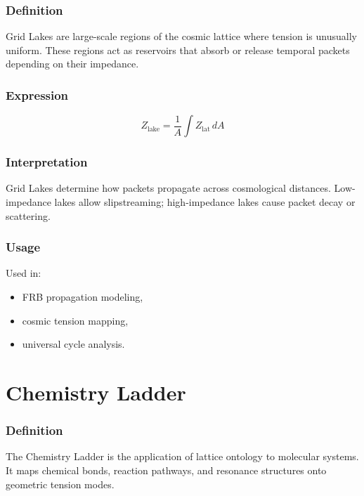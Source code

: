 \documentclass[12pt,oneside]{book}
\begin{document}
\subsubsection{Definition}
Grid Lakes are large-scale regions of the cosmic lattice where tension is unusually uniform.
These regions act as reservoirs that absorb or release temporal packets depending on their
impedance.

\subsubsection{Expression}


\[
Z_{\mathrm{lake}} = \frac{1}{A} \int Z_{\mathrm{lat}} \, dA
\]



\subsubsection{Interpretation}
Grid Lakes determine how packets propagate across cosmological distances.  
Low-impedance lakes allow slipstreaming; high-impedance lakes cause packet decay or scattering.

\subsubsection{Usage}
Used in:
\begin{itemize}
    \item FRB propagation modeling,
    \item cosmic tension mapping,
    \item universal cycle analysis.
\end{itemize}


\section{Chemistry Ladder}

\subsubsection{Definition}
The Chemistry Ladder is the application of lattice ontology to molecular systems. It maps
chemical bonds, reaction pathways, and resonance structures onto geometric tension modes.
\end{document}
